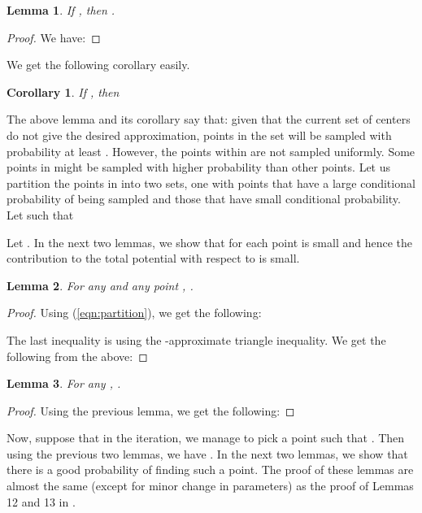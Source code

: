 \documentclass[11pt]{article}
\newtheorem{lemma}{Lemma}
\newtheorem{corollary}{Corollary}
\begin{document}
\begin{lemma}
\label{lem:sampled-repeat}
If , then .
\end{lemma}
\begin{proof}
We have:
{
\allowdisplaybreaks

}
\end{proof}

\noindent
We get the following corollary easily.
\begin{corollary}
\label{cor:sample-repeat}
If , then 
\end{corollary}

The above lemma and its corollary say that: given that the current set of centers do not give the desired approximation, points in the set  will be sampled with probability at least .
However, the points within  are not sampled uniformly.
Some points in  might be sampled with higher probability than other points.
Let us partition the points in  into two sets, one with points that have a large conditional probability of being sampled and those that have small conditional probability.
Let  such that 

Let .
In the next two lemmas, we show that for each point  is small and hence the contribution to the total potential with respect to  is small. 

\begin{lemma}
\label{lem:key-repeat}
For any  and any point , .
\end{lemma}
\begin{proof}
Using (\ref{eqn:partition}), we get the following:

The last inequality is using the -approximate triangle inequality. 
We get the following from the above:

\end{proof}

\begin{lemma}
For any , .
\end{lemma}
\begin{proof}
Using the previous lemma, we get the following:

\end{proof}

Now, suppose that in the  iteration, we manage to pick a point  such that 
.
Then using the previous two lemmas, we have . 
In the next two lemmas, we show that there is a good probability of finding such a point.
The proof of these lemmas are almost the same (except for minor change in parameters) as the proof of Lemmas 12 and 13 in \cite{jks12}.
\end{document}
